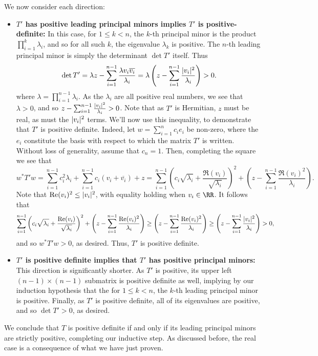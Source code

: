 \documentclass{scrartcl}
\begin{document}
\begin{solution}
        We now consider each direction:
        \begin{itemize}
            \item \textbf{$T'$ has positive leading principal minors implies $T'$ is positive-definite:} In this case, for $1\le k <n$, the $k$-th principal minor is the product $\prod_{i=1}^k \lambda_i$, and so for all such $k$, the eigenvalue $\lambda_k$ is positive. The $n$-th leading principal minor is simply the determinant $\det T'$ itself. Thus
            \[\det T'=\lambda z - \sum_{i=1}^{n-1} \frac{\lambda v_i\overline{v_i}}{\lambda_i}=\lambda\left(z - \sum_{i=1}^{n-1} \frac{ \lvert v_i\rvert^2}{\lambda_i}\right)>0.\]
            where $\lambda=\prod_{i=1}^{n-1}\lambda_i$. As the $\lambda_i$ are all positive real numbers, we see that $\lambda>0$, and so $z - \sum_{i=1}^{n-1} \frac{ \lvert v_i\rvert^2}{\lambda_i}>0$. Note that as $T'$ is Hermitian, $z$ must be real, as must the $\lvert v_i\rvert^2$ terms. We'll now use this inequality, to demonstrate that $T'$ is positive definite. Indeed, let $w=\sum_{i=1}^n c_ie_i$ be non-zero, where the $e_i$ constitute the basis with respect to which the matrix $T'$ is written. Without loss of generality, assume that $c_n=1$. Then, completing the square we see that 
            \[w^\ast T' w=\sum_{i=1}^{n-1} c_i^2\lambda_i+\sum_{i=1}^{n-1}c_i(v_i+\overline{v_i})+z=\sum_{i=1}^{n-1} \left(c_i\sqrt{\lambda_i} + \frac{\Re (v_i)}{\sqrt{\lambda_i}}\right)^2 + \left(z-\sum_{i=1}^{n-1}\frac{\Re (v_i)^2}{\lambda_i} \right).\]
            Note that $\operatorname{Re} (v_i)^2\le \lvert v_i\rvert^2$, with equality holding when $v_i\in \RR$. It follows that
            \[\sum_{i=1}^{n-1} \left(c_i\sqrt{\lambda_i} + \frac{\operatorname{Re} (v_i)}{\sqrt{\lambda_i}}\right)^2 + \left(z-\sum_{i=1}^{n-1}\frac{\operatorname{Re} (v_i)^2}{\lambda_i} \right)\ge \left(z-\sum_{i=1}^{n-1}\frac{\operatorname{Re} (v_i)^2}{\lambda_i} \right) \ge \left(z-\sum_{i=1}^{n-1}\frac{\lvert v_i\rvert^2}{\lambda_i} \right)>0,\]
            and so $w^\ast T' w>0$, as desired. Thus, $T'$ is positive definite.
            
            \item \textbf{$T'$ is positive definite implies that $T'$ has positive principal minors:} This  direction is significantly shorter. As $T'$ is positive, its upper left $(n-1)\times (n-1)$ submatrix is positive definite as well, implying by our induction hypothesis that the for $1\le k < n$, the $k$-th leading principal minor is positive. Finally, as $T'$ is positive definite, all of its eigenvalues are positive, and so $\det T'>0$, as desired.
        \end{itemize}
        We conclude that $T$ is positive definite if and only if its leading principal minors are strictly positive, completing our inductive step. As discussed before, the real case is a consequence of what we have just proven.
    \end{solution}
    
\end{document}
